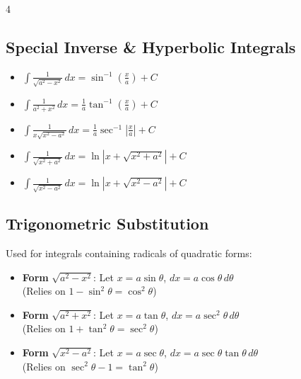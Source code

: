 \documentclass[8pt, landscape, a4paper]{scrartcl}
\begin{document}
\begin{multicols*}{4}
\subsection*{Special Inverse \& Hyperbolic Integrals}
\begin{itemize}
    \item $\int \frac{1}{\sqrt{a^2-x^2}} \, dx = \sin^{-1}\left(\frac{x}{a}\right) + C$
    \item $\int \frac{1}{a^2+x^2} \, dx = \frac{1}{a}\tan^{-1}\left(\frac{x}{a}\right) + C$
    \item $\int \frac{1}{x\sqrt{x^2-a^2}} \, dx = \frac{1}{a}\sec^{-1}\left|\frac{x}{a}\right| + C$
    \item $\int \frac{1}{\sqrt{x^2+a^2}} \, dx = \ln|x + \sqrt{x^2+a^2}| + C$
    \item $\int \frac{1}{\sqrt{x^2-a^2}} \, dx = \ln|x + \sqrt{x^2-a^2}| + C$
\end{itemize}

\subsection*{Trigonometric Substitution}
Used for integrals containing radicals of quadratic forms:
\begin{itemize}
    \item \textbf{Form} $\sqrt{a^2 - x^2}$: Let $x = a \sin \theta$, $dx = a \cos \theta \, d\theta$ \\
    (Relies on $1 - \sin^2 \theta = \cos^2 \theta$)
    \item \textbf{Form} $\sqrt{a^2 + x^2}$: Let $x = a \tan \theta$, $dx = a \sec^2 \theta \, d\theta$ \\
    (Relies on $1 + \tan^2 \theta = \sec^2 \theta$)
    \item \textbf{Form} $\sqrt{x^2 - a^2}$: Let $x = a \sec \theta$, $dx = a \sec \theta \tan \theta \, d\theta$ \\
    (Relies on $\sec^2 \theta - 1 = \tan^2 \theta$)
\end{itemize}
\end{multicols*}
\end{document}
